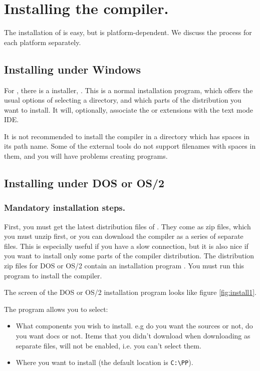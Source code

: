 \section{Installing the compiler.}
The installation of \fpc is easy, but is platform-dependent.
We discuss the process for each platform separately.

\subsection{Installing under Windows}
For \windows, there is a \windows installer, . This is a
normal installation program, which offers the usual options
of selecting a directory, and which parts of the distribution you want
to install. It will, optionally, associate the  or 
extensions with the text mode IDE.

It is not recommended to install the compiler in a directory which
has spaces in its path name. Some of the external tools do not support
filenames with spaces in them, and you will have problems creating
programs.

\subsection{Installing under DOS or OS/2}
\subsubsection{Mandatory installation steps.}
First, you must get the latest distribution files of \fpc. They come as zip
files, which you must unzip first, or you can download the compiler as a
series of separate files. This is especially useful if you have a slow
connection, but it is also nice if you want to install only some parts of the
compiler distribution.  The distribution zip files for DOS or OS/2 contain an
installation program . You must run this program to install
the compiler.

The screen of the DOS or OS/2 installation program looks like figure
\ref{fig:install1}.


The program allows you to select:
\begin{itemize}
\item What components you wish to install. e.g do you want the sources or
not, do you want docs or not. Items that you didn't download when
downloading as separate files, will not be enabled, i.e. you can't
select them.

\item Where you want to install (the default location is \verb|C:\PP|).
\end{itemize}

